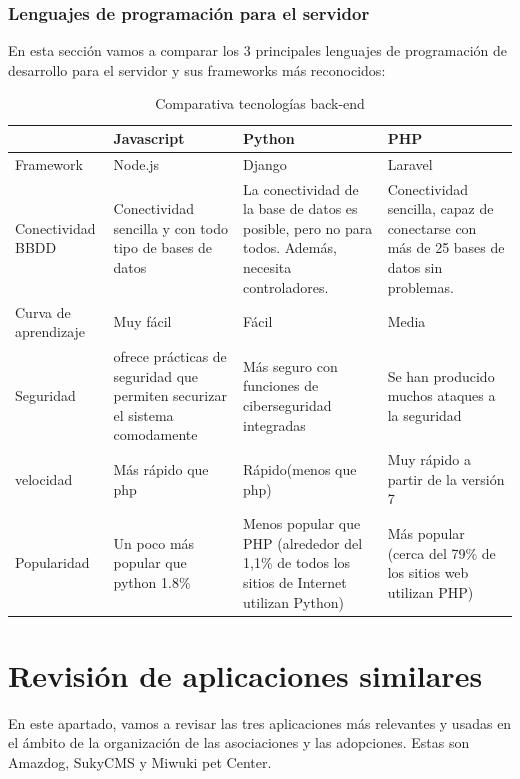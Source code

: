 \subsubsection{Lenguajes de programación para el servidor}
En esta sección vamos a comparar los 3 principales lenguajes de programación de desarrollo para el servidor y sus frameworks más reconocidos: 
\begin{table}[H] %
    \centering
    \begin{tabular}{|p{2cm} |p{3cm} |p{3cm} |p{3cm} |} \hline 
         &  \textbf{Javascript}&  \textbf{Python}& \textbf{PHP}\\  \hline 
         Framework &  Node.js &  Django & Laravel\\ \hline
         
        Conectividad BBDD &  Conectividad sencilla y con todo tipo de bases de datos&  La conectividad de la base de datos es posible, pero no para todos. Además, necesita controladores. & Conectividad sencilla, capaz de conectarse con más de 25 bases de datos sin problemas.\\ \hline 
        Curva de aprendizaje &  Muy fácil & Fácil & Media\\ \hline 
        Seguridad &  ofrece prácticas de seguridad que permiten securizar el sistema comodamente &  Más seguro con funciones de ciberseguridad integradas & Se han producido muchos ataques a la seguridad	\\ \hline 
        velocidad &  Más rápido que php &  Rápido(menos que php) & Muy rápido a partir de la versión 7\\ \hline 
        Popularidad & Un poco más popular que python 1.8\% &  Menos popular que PHP (alrededor del 1,1\% de todos los sitios de Internet utilizan Python) & Más popular (cerca del 79\% de los sitios web utilizan PHP)\\ \hline 
    \end{tabular}
    \caption{Comparativa tecnologías back-end }
    \label{tab:tec_back}
\end{table}

\section{Revisión de aplicaciones similares} \label{appssimilares}

En este apartado, vamos a revisar las tres aplicaciones más relevantes y usadas en el ámbito de la organización de las asociaciones y las adopciones. Estas son Amazdog, SukyCMS y Miwuki pet Center.

